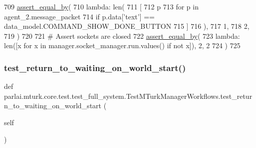 \begin{DoxyCode}
709         \hyperlink{namespaceparlai_1_1mturk_1_1core_1_1test_1_1test__full__system_a0b463246d35658a2e422010f13dcf819}{assert\_equal\_by}(
710             \textcolor{keyword}{lambda}: len(
711                 [
712                     p
713                     \textcolor{keywordflow}{for} p \textcolor{keywordflow}{in} agent\_2.message\_packet
714                     \textcolor{keywordflow}{if} p.data[\textcolor{stringliteral}{'text'}] == data\_model.COMMAND\_SHOW\_DONE\_BUTTON
715                 ]
716             ),
717             1,
718             2,
719         )
720 
721         \textcolor{comment}{# Assert sockets are closed}
722         \hyperlink{namespaceparlai_1_1mturk_1_1core_1_1test_1_1test__full__system_a0b463246d35658a2e422010f13dcf819}{assert\_equal\_by}(
723             \textcolor{keyword}{lambda}: len([x \textcolor{keywordflow}{for} x \textcolor{keywordflow}{in} manager.socket\_manager.run.values() \textcolor{keywordflow}{if} \textcolor{keywordflow}{not} x]), 2, 2
724         )
725 
\end{DoxyCode}
\mbox{\label{classparlai_1_1mturk_1_1core_1_1test_1_1test__full__system_1_1TestMTurkManagerWorkflows_a1c8e8bb8eca161157b7b5dc154b687f6}} 
\subsubsection{\texorpdfstring{test\+\_\+return\+\_\+to\+\_\+waiting\+\_\+on\+\_\+world\+\_\+start()}{test\_return\_to\_waiting\_on\_world\_start()}}
{\footnotesize\ttfamily def parlai.\+mturk.\+core.\+test.\+test\+\_\+full\+\_\+system.\+Test\+M\+Turk\+Manager\+Workflows.\+test\+\_\+return\+\_\+to\+\_\+waiting\+\_\+on\+\_\+world\+\_\+start (\begin{DoxyParamCaption}\item[{}]{self }\end{DoxyParamCaption})}



